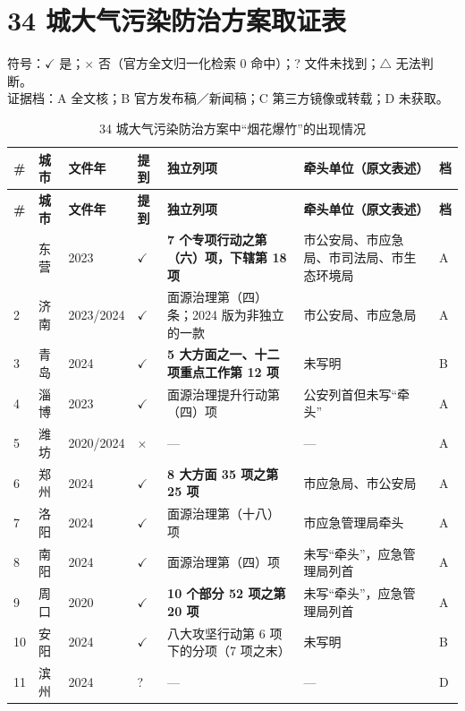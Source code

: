 \section{34 城大气污染防治方案取证表}\label{app:documents}

\noindent 符号：$\checkmark$ 是；$\times$ 否（官方全文归一化检索 0 命中）；? 文件未找到；$\triangle$ 无法判断。\\
证据档：A 全文核；B 官方发布稿／新闻稿；C 第三方镜像或转载；D 未获取。

\begingroup
\footnotesize
\setlength{\tabcolsep}{3.5pt}
\begin{longtable}{@{}R{0.55cm}L{1.15cm}L{1.35cm}C{0.85cm}L{4.35cm}L{4.45cm}C{1.2cm}@{}}
\caption{34 城大气污染防治方案中“烟花爆竹”的出现情况}\label{tab:34-app}\\
\toprule
\textbf{\#} & \textbf{城市} & \textbf{文件年} & \textbf{提到} & \textbf{独立列项} & \textbf{牵头单位（原文表述）} & \textbf{档} \\
\midrule
\endfirsthead
\toprule
\textbf{\#} & \textbf{城市} & \textbf{文件年} & \textbf{提到} & \textbf{独立列项} & \textbf{牵头单位（原文表述）} & \textbf{档} \\
\midrule
\endhead
\bottomrule
{} & 东营 & 2023 & $\checkmark$ & \textbf{7 个专项行动之第（六）项，下辖第 18 项} & 市公安局、市应急局、市司法局、市生态环境局 & A \\
2 & 济南 & 2023\slash2024 & $\checkmark$ & 面源治理第（四）条；2024 版为非独立的一款 & 市公安局、市应急局 & A \\
3 & 青岛 & 2024 & $\checkmark$ & \textbf{5 大方面之一、十二项重点工作第 12 项} & 未写明 & B \\
4 & 淄博 & 2023 & $\checkmark$ & 面源治理提升行动第（四）项 & 公安列首但未写“牵头” & A \\
5 & 潍坊 & 2020\slash2024 & $\times$ & — & — & A \\
6 & 郑州 & 2024 & $\checkmark$ & \textbf{8 大方面 35 项之第 25 项} & 市应急局、市公安局 & A \\
7 & 洛阳 & 2024 & $\checkmark$ & 面源治理第（十八）项 & 市应急管理局牵头 & A \\
8 & 南阳 & 2024 & $\checkmark$ & 面源治理第（四）项 & 未写“牵头”，应急管理局列首 & A \\
9 & 周口 & 2020 & $\checkmark$ & \textbf{10 个部分 52 项之第 20 项} & 未写“牵头”，应急管理局列首 & A \\
10 & 安阳 & 2024 & $\checkmark$ & 八大攻坚行动第 6 项下的分项（7 项之末） & 未写明 & B \\
11 & 滨州 & 2024 & ? & — & — & D \\

\end{longtable}
